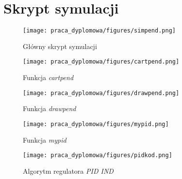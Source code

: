 \chapter{Skrypt symulacji}
\begin{figure}[tp]
    \centering
    \texttt{[image: praca\_dyplomowa/figures/simpend.png]}
    \caption{Główny skrypt symulacji}
    \label{fig:simpend}
\end{figure}

\begin{figure}
    \centering
    \texttt{[image: praca\_dyplomowa/figures/cartpend.png]}
    \caption{Funkcja \textit{cartpend}}
    \label{fig:cartpend}
\end{figure}

\begin{figure}
    \centering
    \texttt{[image: praca\_dyplomowa/figures/drawpend.png]}
    \caption{Funkcja \textit{drawpend}}
    \label{fig:drawpend}
\end{figure}

\begin{figure}
    \centering
    \texttt{[image: praca\_dyplomowa/figures/mypid.png]}
    \caption{Funkcja \textit{mypid}}
    \label{fig:mypid}
\end{figure}

\begin{figure}
    \centering
    \texttt{[image: praca\_dyplomowa/figures/pidkod.png]}
    \caption{Algorytm regulatora \textit{PID IND}}
    \label{fig:pidind}
\end{figure}